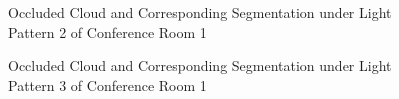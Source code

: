 \documentclass[11pt, a4paper,oneside,chapterprefix=false]{scrbook}
\begin{document}
\begin{figure}[H]
    \centering
      \label{fig:conf1 1 occluded} \hfill
     \label{fig:conf1 1 seg}
    \caption{Occluded Cloud and Corresponding Segmentation under Light Pattern 2 of Conference Room 1}
    \label{fig:conf1 1 occ and seg}
\end{figure}

\begin{figure}[H]
    \centering
      \label{fig:conf1 2 occluded} \hfill
     \label{fig:conf1 2 seg}
    \caption{Occluded Cloud and Corresponding Segmentation under Light Pattern 3 of Conference Room 1}
    \label{fig:conf1 2 occ and seg}
\end{figure}
\end{document}
